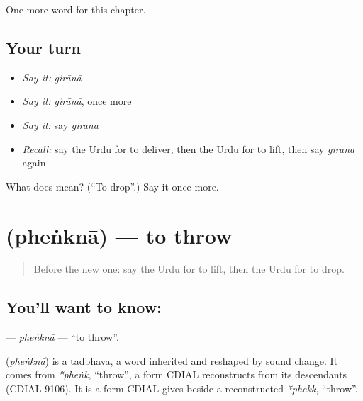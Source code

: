 \begin{grammarlens}[title={What you've built}]
One more word for this chapter.
\end{grammarlens}

\subsection*{Your turn}
\begin{itemize}
\raggedright
  \item \emph{Say it:} \emph{girānā}
  \item \emph{Say it:} \emph{girānā}, once more
  \item \emph{Say it:} say \emph{girānā}
  \item \emph{Recall:} say the Urdu for to deliver, then the Urdu for to lift, then say \emph{girānā} again
\end{itemize}

\begin{tcolorbox}[breakable,colback=teal!4,colframe=teal!35!black,title={Before you move on}]
What does  mean? (\textquotedblleft{}To drop\textquotedblright{}.) Say it once more.
\end{tcolorbox}
\section[\texorpdfstring{\ur{پھینکنا} (pheṅknā)}{پھینکنا (pheṅknā)}]{ (pheṅknā) — to throw}

\label{lesson:UR-C213-phenkna}



\begin{quote}
Before the new one: say the Urdu for to lift, then the Urdu for to drop.
\end{quote}

\subsection*{You'll want to know: }
\textbf{} — \emph{pheṅknā} — \textquotedblleft{}to throw\textquotedblright{}.

\begin{cousinweb}
\textbf{} (\emph{pheṅknā}) is a tadbhava, a word inherited and reshaped by sound change. It comes from \emph{*pheṅk}, \textquotedblleft{}throw\textquotedblright{}, a form CDIAL reconstructs from its descendants (CDIAL 9106). It is a form CDIAL gives beside a reconstructed \emph{*phekk}, \textquotedblleft{}throw\textquotedblright{}.
\end{cousinweb}

